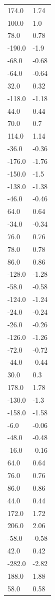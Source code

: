 \begin{longtable}{ll}
174.0 & 1.74 \\
100.0 & 1.0 \\
78.0 & 0.78 \\
-190.0 & -1.9 \\
-68.0 & -0.68 \\
-64.0 & -0.64 \\
32.0 & 0.32 \\
-118.0 & -1.18 \\
44.0 & 0.44 \\
70.0 & 0.7 \\
114.0 & 1.14 \\
-36.0 & -0.36 \\
-176.0 & -1.76 \\
-150.0 & -1.5 \\
-138.0 & -1.38 \\
-46.0 & -0.46 \\
64.0 & 0.64 \\
-34.0 & -0.34 \\
76.0 & 0.76 \\
78.0 & 0.78 \\
86.0 & 0.86 \\
-128.0 & -1.28 \\
-58.0 & -0.58 \\
-124.0 & -1.24 \\
-24.0 & -0.24 \\
-26.0 & -0.26 \\
-126.0 & -1.26 \\
-72.0 & -0.72 \\
-44.0 & -0.44 \\
30.0 & 0.3 \\
178.0 & 1.78 \\
-130.0 & -1.3 \\
-158.0 & -1.58 \\
-6.0 & -0.06 \\
-48.0 & -0.48 \\
-16.0 & -0.16 \\
64.0 & 0.64 \\
76.0 & 0.76 \\
86.0 & 0.86 \\
44.0 & 0.44 \\
172.0 & 1.72 \\
206.0 & 2.06 \\
-58.0 & -0.58 \\
42.0 & 0.42 \\
-282.0 & -2.82 \\
188.0 & 1.88 \\
58.0 & 0.58 \\

\end{longtable}
